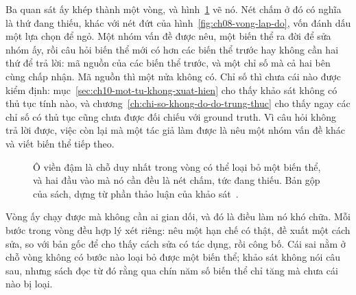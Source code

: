 Ba quan sát ấy khép thành một vòng, và hình~\ref{fig:ch10-vong-bien-the} vẽ nó.
Nét chấm ở đó có nghĩa là thứ đang thiếu, khác với nét đứt của
hình~\ref{fig:ch08-vong-lap-do}, vốn đánh dấu một lựa chọn để ngỏ.
Một nhóm vấn đề được nêu, một biến thể ra đời để sửa nhóm ấy, rồi câu hỏi biến
thể mới có hơn các biến thể trước hay không cần hai thứ để trả lời: mã nguồn của
các biến thể trước, và một chỉ số mà cả hai bên cùng chấp nhận. Mã nguồn thì
một nửa không có. Chỉ số thì chưa cái nào được kiểm định:
mục~\ref{sec:ch10-mot-tu-khong-xuat-hien} cho thấy khảo sát không có thủ tục
tính nào, và chương~\ref{ch:chi-so-khong-do-do-trung-thuc} cho thấy ngay các
chỉ số có thủ tục cũng chưa được đối chiếu với ground truth. Vì câu hỏi không trả
lời được, việc còn lại mà một tác giả làm được là nêu một nhóm vấn đề khác và
viết biến thể tiếp theo.

\begin{figure}[htbp]
  \centering
  
  \caption{Ô viền đậm là chỗ duy nhất trong vòng có thể loại bỏ một biến thể, và
  hai đầu vào mà nó cần đều là nét chấm, tức đang thiếu. Bản gộp của sách, dựng
  từ phần thảo luận của khảo sát~\autocite{p22whichlime}.}
  \label{fig:ch10-vong-bien-the}
\end{figure}

Vòng ấy chạy được mà không cần ai gian dối, và đó là điều làm nó khó chữa. Mỗi
bước trong vòng đều hợp lý xét riêng: nêu một hạn chế có thật, đề xuất một cách
sửa, so với bản gốc để cho thấy cách sửa có tác dụng, rồi công bố. Cái sai nằm ở
chỗ vòng không có bước nào loại bỏ được một biến thể; khảo sát không nói câu
sau, nhưng sách đọc từ đó rằng qua chín năm số biến thể chỉ tăng mà chưa cái
nào bị loại.
